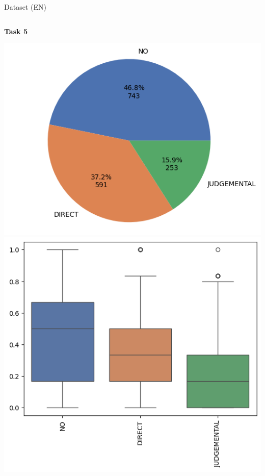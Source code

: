 \begin{frame}{Dataset (EN)}
\begin{columns}[T]
        \begin{column}{0.3\textwidth}
            \centering %
            \textbf{Task 5}

            \includegraphics[height=0.4\textheight, width=\textwidth, keepaspectratio]{images/t5_en_hard_presentacion.png}%
            \vfill
            \includegraphics[height=0.4\textheight, width=\textwidth, keepaspectratio]{images/t5_en_soft_presentacion.png}%
        \end{column}


\end{columns}
\end{frame}
